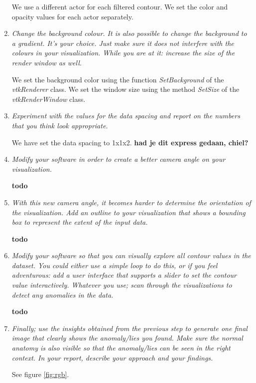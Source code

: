 \documentclass{article}[10pt]
\begin{document}
\begin{enumerate}
We use a different actor for each filtered contour. We set the color and opacity
values for each actor separately.

    \item \textit{Change the background colour. It is also possible to change
the background to a gradient. It’s your choice. Just make sure it does not
interfere with the colours in your visualization. While you are at it: increase
the size of the render window as well.}

We set the background color using the function \emph{SetBackground} of the
\emph{vtkRenderer} class. We set the window size using the method \emph{SetSize}
of the \emph{vtkRenderWindow} class.

    \item \textit{Experiment with the values for the data spacing and report on
the numbers that you think look appropriate.}

We have set the data spacing to 1x1x2. \textbf{had je dit express gedaan,
chiel?}

    \item \textit{Modify your software in order to create a better camera angle
on your visualization.}

\textbf{todo}

    \item \textit{With this new camera angle, it becomes harder to determine the
orientation of the visualization. Add an outline to your visualization that
shows a bounding box to represent the extent of the input data.}

\textbf{todo}

    \item \textit{Modify your software so that you can visually explore all
contour values in the dataset. You could either use a simple loop to do this, or
if you feel adventurous: add a user interface that supports a slider to set the
contour value interactively. Whatever you use; scan through the visualizations
to detect any anomalies in the data.}

\textbf{todo}

    \item \textit{Finally; use the insights obtained from the previous step to
generate one final image that clearly shows the anomaly/lies you found. Make
sure the normal anatomy is also visible so that the anomaly/lies can be seen in
the right context. In your report, describe your approach and your findings.}

See figure \ref{fig:rgb}.

\end{enumerate}
\end{document}
